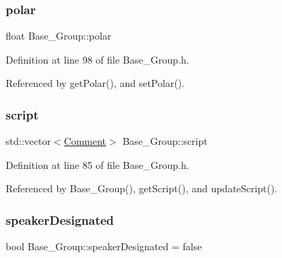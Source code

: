 \mbox{\label{class_base___group_a0c2dfa52ac107ec9564bfc42917e8ce0}} 
\subsubsection{\texorpdfstring{polar}{polar}}
{\footnotesize\ttfamily float Base\+\_\+\+Group\+::polar\hspace{0.3cm}{\ttfamily [private]}}



Definition at line 98 of file Base\+\_\+\+Group.\+h.



Referenced by get\+Polar(), and set\+Polar().

\mbox{\label{class_base___group_a98fbcb0bb85a488e29db9465c18715cc}} 
\subsubsection{\texorpdfstring{script}{script}}
{\footnotesize\ttfamily std\+::vector$<$\hyperlink{class_comment}{Comment}$>$ Base\+\_\+\+Group\+::script\hspace{0.3cm}{\ttfamily [private]}}



Definition at line 85 of file Base\+\_\+\+Group.\+h.



Referenced by Base\+\_\+\+Group(), get\+Script(), and update\+Script().

\mbox{\label{class_base___group_ae6dfeabc8b679db58666e997653f4cec}} 
\subsubsection{\texorpdfstring{speaker\+Designated}{speakerDesignated}}
{\footnotesize\ttfamily bool Base\+\_\+\+Group\+::speaker\+Designated = false\hspace{0.3cm}{\ttfamily [private]}}



